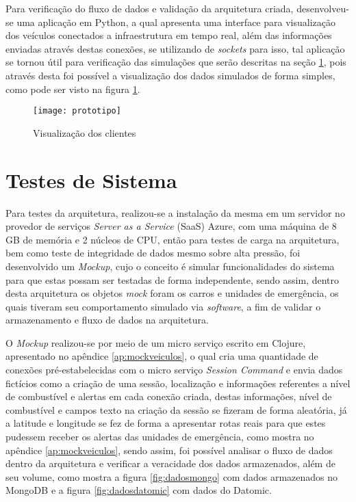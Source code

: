 Para verificação do fluxo de dados e validação da arquitetura criada, desenvolveu-se uma aplicação em Python, a qual apresenta uma interface para visualização dos veículos conectados a infraestrutura em tempo real, além das informações enviadas através destas conexões, se utilizando de \textit{sockets} para isso, tal aplicação se tornou útil para verificação das simulações que serão descritas na seção \ref{sec:testessistema}, pois através desta foi possível a visualização dos dados simulados de forma simples, como pode ser visto na figura \ref{fig:prototipo}.

\begin{figure}[!h]
\caption{\label{fig:prototipo} Visualização dos clientes}
\begin{center}
\texttt{[image: prototipo]}
\end{center}
\end{figure}

\section{Testes de Sistema}
\label{sec:testessistema}
Para testes da arquitetura, realizou-se a instalação da mesma em um servidor no provedor de serviços \textit{Server as a Service} (SaaS) Azure, com uma máquina de 8 GB de memória e 2 núcleos de CPU, então para testes de carga na arquitetura, bem como teste de integridade de dados mesmo sobre alta pressão, foi desenvolvido um \textit{Mockup}, cujo o conceito é simular funcionalidades do sistema para que estas possam ser testadas de forma independente, sendo assim, dentro desta arquitetura os objetos \textit{mock} foram os carros e unidades de emergência, os quais tiveram seu comportamento simulado via \textit{software}, a fim de validar o armazenamento e fluxo de dados na arquitetura.

O \textit{Mockup} realizou-se por meio de um micro serviço escrito em Clojure, apresentado no apêndice \ref{ap:mockveiculos}, o qual cria uma quantidade de conexões pré-estabelecidas com o micro serviço \textit{Session Command} e envia dados fictícios como a criação de uma sessão, localização e informações referentes a nível de combustível e alertas em cada conexão criada, destas informações, nível de combustível e campos texto na criação da sessão se fizeram de forma aleatória, já a latitude e longitude se fez de forma a apresentar rotas reais para que estes pudessem receber os alertas das unidades de emergência, como mostra no apêndice \ref{ap:mockveiculos}, sendo assim, foi possível analisar o fluxo de dados dentro da arquitetura e verificar a veracidade dos dados armazenados, além de seu volume, como mostra a figura \ref{fig:dadosmongo} com dados armazenados no MongoDB e a figura \ref{fig:dadosdatomic} com dados do Datomic.

